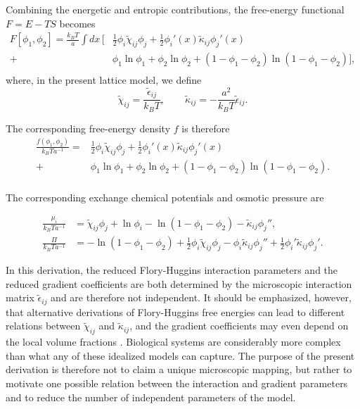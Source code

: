 \documentclass[12pt]{article}
\begin{document}
Combining the energetic and entropic contributions, the free-energy functional \(F=E-TS\) becomes
\begin{equation}
\label{eq:fh_free_energy}
\begin{aligned}
F[\phi_1,\phi_2]
=
\frac{k_B T}{a}\int dx\,
\Big[&
\frac{1}{2}\phi_i\tilde{\chi}_{ij}\phi_j
+
\frac{1}{2}\phi_i'(x)\tilde{\kappa}_{ij}\phi_j'(x)\\
+&
\phi_1\ln\phi_1
+
\phi_2\ln\phi_2
+
(1-\phi_1-\phi_2)\ln(1-\phi_1-\phi_2)
\Big],\\
\end{aligned}
\end{equation}
where, in the present lattice model, we define
\begin{equation}
\tilde{\chi}_{ij}=\frac{\tilde{\epsilon}_{ij}}{k_B T},
\qquad
\tilde{\kappa}_{ij}=-\frac{a^2}{k_B T}\tilde{\epsilon}_{ij}.
\label{eq:chi_kappa_relation}
\end{equation}

The corresponding free-energy density \(f\) is therefore
\begin{equation}
\label{eq:fh_free_energy_density}
\begin{aligned}
\frac{f(\phi_1,\phi_2)}{k_B T a^{-1}}
=&
\frac{1}{2}\phi_i\tilde{\chi}_{ij}\phi_j
+
\frac{1}{2}\phi_i'(x)\tilde{\kappa}_{ij}\phi_j'(x)\\
+&
\phi_1\ln\phi_1
+
\phi_2\ln\phi_2
+
(1-\phi_1-\phi_2)\ln(1-\phi_1-\phi_2).\\
\end{aligned}
\end{equation}


The corresponding exchange chemical potentials and osmotic pressure are

\begin{subequations}
\begin{align}
\frac{\mu_i}{k_B T a^{-1}}
&=
\tilde{\chi}_{ij}\phi_j
+
\ln\phi_i
-
\ln(1-\phi_1-\phi_2)
-
\tilde{\kappa}_{ij}\phi_j'',
\\
\frac{\Pi}{k_B T a^{-1}}
&=
-\ln(1-\phi_1-\phi_2)
+
\frac{1}{2}\phi_i\tilde{\chi}_{ij}\phi_j
-
\phi_i\tilde{\kappa}_{ij}\phi_j''
+
\frac{1}{2}\phi_i'\tilde{\kappa}_{ij}\phi_j'.
\end{align}
\label{eq:chemical_potential_and_pressure}
\end{subequations}


In this derivation, the reduced Flory-Huggins interaction parameters and the reduced gradient coefficients are both determined by the microscopic interaction matrix \(\tilde{\epsilon}_{ij}\) and are therefore not independent. It should be emphasized, however, that alternative derivations of Flory-Huggins free energies can lead to different relations between \(\tilde{\chi}_{ij}\) and \(\tilde{\kappa}_{ij}\), and the gradient coefficients may even depend on the local volume fractions \cite{Tang1991FreeEnergyFunctional,Lifschitz1993InterfacialBehavior}. Biological systems are considerably more complex than what any of these idealized models can capture. The purpose of the present derivation is therefore not to claim a unique microscopic mapping, but rather to motivate one possible relation between the interaction and gradient parameters and to reduce the number of independent parameters of the model.
\end{document}
